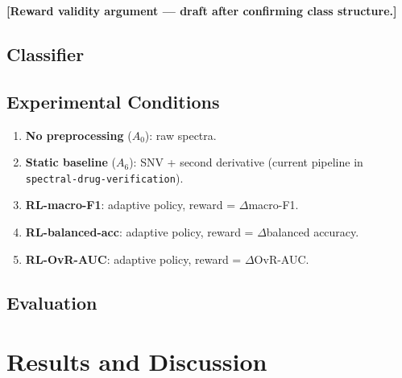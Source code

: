 \documentclass[runningheads]{llncs}
\begin{document}
\textbf{[Reward validity argument — draft after confirming class structure.]}

\subsection{Classifier}

%

\subsection{Experimental Conditions}

\begin{enumerate}
  \item \textbf{No preprocessing} ($A_0$): raw spectra.
  \item \textbf{Static baseline} ($A_6$): SNV + second derivative
        (current pipeline in \texttt{spectral-drug-verification}).
  \item \textbf{RL-macro-F1}: adaptive policy, reward = $\Delta$macro-F1.
  \item \textbf{RL-balanced-acc}: adaptive policy, reward = $\Delta$balanced accuracy.
  \item \textbf{RL-OvR-AUC}: adaptive policy, reward = $\Delta$OvR-AUC.
\end{enumerate}

\subsection{Evaluation}

%

\section{Results and Discussion}
\end{document}
